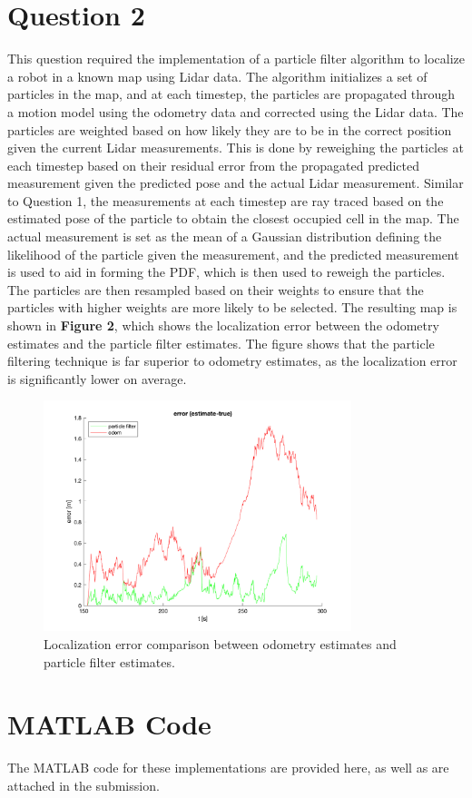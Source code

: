 \documentclass{article}
\begin{document}
\section{Question 2}
This question required the implementation of a particle filter algorithm to localize a robot in a known map using Lidar data.
The algorithm initializes a set of particles in the map, and at each timestep, the particles are propagated through a motion model using the odometry data and corrected using the Lidar data.
The particles are weighted based on how likely they are to be in the correct position given the current Lidar measurements. This is done by
reweighing the particles at each timestep based on their residual error from the propagated predicted measurement given the predicted pose
and the actual Lidar measurement. Similar to Question 1, the measurements at each timestep are ray traced based on the estimated pose of the particle
to obtain the closest occupied cell in the map. The actual measurement is set as the mean of a Gaussian distribution defining the likelihood of the particle given the measurement,
and the predicted measurement is used to aid in forming the PDF, which is then used to reweigh the particles. The particles are then resampled based on their weights to ensure that the particles
with higher weights are more likely to be selected. The resulting map is shown in \textbf{Figure 2}, which shows the localization error between the odometry estimates and the particle filter estimates.
The figure shows that the particle filtering technique is far superior to odometry estimates, as the localization error is significantly lower on average.

\begin{figure}[h!]
    \centering
    \includegraphics[width=0.8\textwidth]{ass2_q2.png}
    \caption{Localization error comparison between odometry estimates and particle filter estimates.}
\end{figure}

\section{MATLAB Code}

The MATLAB code for these implementations are provided here, as well as are attached in the submission.




\end{document}
